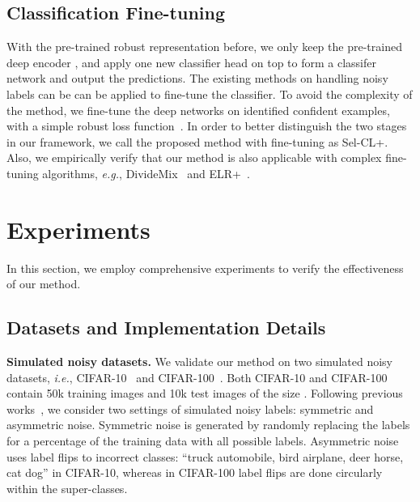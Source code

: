 \documentclass[10pt,twocolumn,letterpaper]{article}
\newcommand{\myPara}[1]{\vspace{.05in}\noindent\textbf{#1}}
\begin{document}
\subsection{Classification Fine-tuning}
With the pre-trained robust representation before, we only keep the pre-trained deep encoder , and apply one new classifier head on top to form a classifer network  and output the predictions. The existing methods on handling noisy labels can be can be applied to fine-tune the classifier. To avoid the complexity of the method, we fine-tune the deep networks on identified confident examples, with a simple robust loss function~\cite{Ortego2021}. In order to better distinguish the two stages in our framework, we call the proposed method with fine-tuning as Sel-CL+. Also, we empirically verify that our method is also applicable with complex fine-tuning algorithms, \textit{e.g.}, DivideMix~\cite{LiSH20} and ELR+~\cite{LiuNRF20}. 



\vspace{-5pt}
\section{Experiments}\label{sec:4}
In this section, we employ comprehensive experiments to verify the effectiveness of our method.
\subsection{Datasets and Implementation Details}\label{sec:4.1}
\vspace{-5pt}
\myPara{Simulated noisy datasets.}
We validate our method on two simulated noisy datasets, \textit{i.e.}, CIFAR-10~\cite{krizhevsky2009learning} and CIFAR-100~\cite{krizhevsky2009learning}. Both CIFAR-10 and CIFAR-100 contain 50k training images and 10k test images of the size . Following previous works~\cite{tanaka2018joint, LiSH20,Ortego2021}, we consider two settings of simulated noisy labels: symmetric and asymmetric noise. Symmetric noise is generated by randomly replacing the labels for a percentage of the training data with all possible labels. Asymmetric noise uses label flips to incorrect classes: ``truck  automobile, bird  airplane, deer  horse, cat  dog'' in CIFAR-10, whereas in CIFAR-100 label flips are done circularly within the super-classes. 
\end{document}
